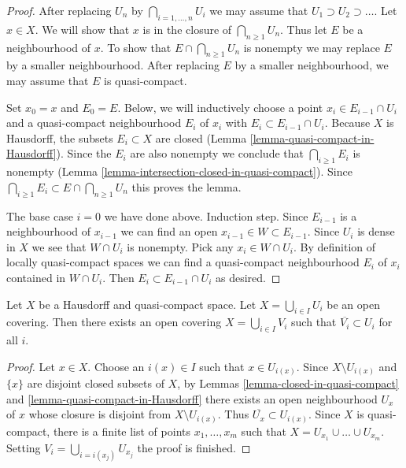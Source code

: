 \begin{proof}
After replacing $U_n$ by $\bigcap_{i = 1, \ldots, n} U_i$
we may assume that $U_1 \supset U_2 \supset \ldots$.
Let $x \in X$. We will show that $x$ is in the closure of
$\bigcap_{n \geq 1} U_n$. Thus let $E$ be a neighbourhood of $x$.
To show that $E \cap \bigcap_{n \geq 1} U_n$ is nonempty we
may replace $E$ by a smaller neighbourhood. After replacing
$E$ by a smaller neighbourhood, we may assume that $E$ is quasi-compact.

\medskip\noindent
Set $x_0 = x$ and $E_0 = E$. Below, we will inductively choose
a point $x_i \in E_{i - 1} \cap U_i$ and a quasi-compact
neighbourhood $E_i$ of $x_i$ with $E_i \subset E_{i - 1} \cap U_i$.
Because $X$ is Hausdorff, the subsets $E_i \subset X$ are closed
(Lemma \ref{lemma-quasi-compact-in-Hausdorff}).
Since the $E_i$ are also nonempty we conclude that
$\bigcap_{i \geq 1} E_i$ is nonempty
(Lemma \ref{lemma-intersection-closed-in-quasi-compact}).
Since $\bigcap_{i \geq 1} E_i \subset E \cap \bigcap_{n \geq 1} U_n$
this proves the lemma.

\medskip\noindent
The base case $i = 0$ we have done above. Induction step.
Since $E_{i - 1}$ is a neighbourhood of $x_{i - 1}$ we can
find an open $x_{i - 1} \in W \subset E_{i - 1}$.
Since $U_i$ is dense in $X$
we see that $W \cap U_i$ is nonempty.
Pick any $x_i \in W \cap U_i$.
By definition of locally quasi-compact spaces we can
find a quasi-compact neighbourhood $E_i$ of $x_i$
contained in $W \cap U_i$. Then $E_i \subset E_{i - 1} \cap U_i$
as desired.
\end{proof}

\begin{lemma}
\label{lemma-relatively-compact-refinement}
Let $X$ be a Hausdorff and quasi-compact space.
Let $X = \bigcup_{i \in I} U_i$ be an open covering.
Then there exists an open covering $X = \bigcup_{i \in I} V_i$
such that $\overline{V_i} \subset U_i$ for all $i$.
\end{lemma}

\begin{proof}
Let $x \in X$. Choose an $i(x) \in I$ such that $x \in U_{i(x)}$.
Since $X \setminus U_{i(x)}$ and $\{x\}$ are disjoint closed
subsets of $X$, by Lemmas \ref{lemma-closed-in-quasi-compact} and
\ref{lemma-quasi-compact-in-Hausdorff}
there exists an open neighbourhood $U_x$ of $x$
whose closure is disjoint from $X \setminus U_{i(x)}$.
Thus $\overline{U_x} \subset U_{i(x)}$. Since $X$ is quasi-compact,
there is a finite list of points $x_1, \ldots, x_m$ such that
$X = U_{x_1} \cup \ldots \cup U_{x_m}$. Setting
$V_i = \bigcup_{i = i(x_j)} U_{x_j}$ the proof is finished.
\end{proof}

